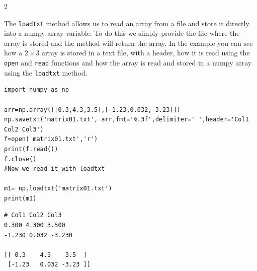 \begin{paracol}{2}
 \switchcolumn

 The \texttt{loadtxt} method allows us to read an array from a file and store it directly into a numpy array variable. To do this we simply provide the file where the array is stored and the method will return the array. In the example you can see how a $2\times 3$ array is stored in a text file, with a header, how it is read using the \texttt{open} and \texttt{read} functions and how the array is read and stored in a numpy array using the \texttt{loadtxt} method.
 
\end{paracol}
\begin{verbatim}
import numpy as np

arr=np.array([[0.3,4.3,3.5],[-1.23,0.032,-3.23]])
np.savetxt('matrix01.txt', arr,fmt='%.3f',delimiter=' ',header='Col1 Col2 Col3')
f=open('matrix01.txt','r')
print(f.read())
f.close()
#Now we read it with loadtxt

m1= np.loadtxt('matrix01.txt')
print(m1)

\end{verbatim}

\begin{verbatim}
# Col1 Col2 Col3
0.300 4.300 3.500
-1.230 0.032 -3.230

[[ 0.3    4.3    3.5  ]
 [-1.23   0.032 -3.23 ]]
\end{verbatim}


